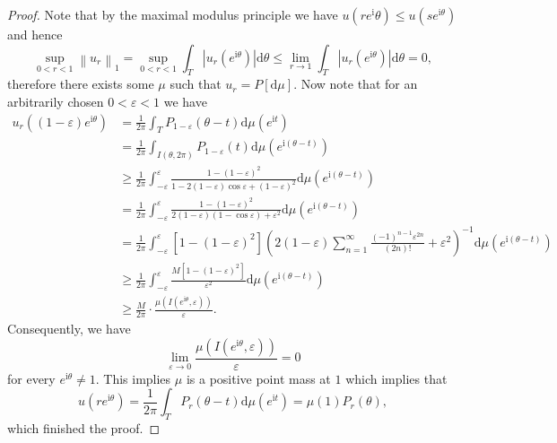 \begin{proof}
Note that by the maximal modulus principle we have $u(re^\mathrm{i}\theta)\le u(se^{\mathrm{i}\theta})$ and hence 
$$
\mathop {\mathrm{sup}} \limits_{0<r<1}\left\| u_r \right\| _1=\mathop {\mathrm{sup}} \limits_{0<r<1}\int_T{\left| u_r\left( e^{\mathrm{i}\theta} \right) \right|\mathrm{d}\theta}\le \lim_{r\rightarrow 1} \int_T{\left| u_r\left( e^{\mathrm{i}\theta} \right) \right|\mathrm{d}\theta}=0,
$$
therefore there exists some $\mu$ such that $u_r=P[\mathrm{d}\mu]$. Now note that for an arbitrarily chosen $0<\varepsilon<1$ we have 
$$
\begin{aligned}
u_r\left( \left( 1-\varepsilon \right) e^{\mathrm{i}\theta} \right) &=\frac{1}{2\pi}\int_T{P_{1-\varepsilon}\left( \theta -t \right) \mathrm{d}\mu \left( e^{\mathrm{i}t} \right)}
\\
&=\frac{1}{2\pi}\int_{I\left( \theta ,2\pi \right)}{P_{1-\varepsilon}\left( t \right) \mathrm{d}\mu \left( e^{\mathrm{i}\left( \theta -t \right)} \right)}
\\
&\ge \frac{1}{2\pi}\int_{-\varepsilon}^{\varepsilon}{\frac{1-\left( 1-\varepsilon \right) ^2}{1-2\left( 1-\varepsilon \right) \cos \varepsilon +\left( 1-\varepsilon \right) ^2}\mathrm{d}\mu \left( e^{\mathrm{i}\left( \theta -t \right)} \right)}
\\
&=\frac{1}{2\pi}\int_{-\varepsilon}^{\varepsilon}{\frac{1-\left( 1-\varepsilon \right) ^2}{2\left( 1-\varepsilon \right) \left( 1-\cos \varepsilon \right) +\varepsilon ^2}\mathrm{d}\mu \left( e^{\mathrm{i}\left( \theta -t \right)} \right)}
\\
&=\frac{1}{2\pi}\int_{-\varepsilon}^{\varepsilon}{\left[ 1-\left( 1-\varepsilon \right) ^2 \right] \left( 2\left( 1-\varepsilon \right) \sum_{n=1}^{\infty}{\frac{\left( -1 \right) ^{n-1}\varepsilon ^{2n}}{\left( 2n \right) !}}+\varepsilon ^2 \right) ^{-1}\mathrm{d}\mu \left( e^{\mathrm{i}\left( \theta -t \right)} \right)}
\\
&\ge \frac{1}{2\pi}\int_{-\varepsilon}^{\varepsilon}{\frac{M\left[ 1-\left( 1-\varepsilon \right) ^2 \right]}{\varepsilon ^2}\mathrm{d}\mu \left( e^{\mathrm{i}\left( \theta -t \right)} \right)}
\\
&\ge \frac{M}{2\pi}\cdot \frac{\mu \left( I\left( e^{\mathrm{i}\theta},\varepsilon \right) \right)}{\varepsilon}.
\end{aligned}
$$
Consequently, we have 
$$
\lim_{\varepsilon \rightarrow 0} \frac{\mu \left( I\left( e^{\mathrm{i}\theta},\varepsilon \right) \right)}{\varepsilon}=0
$$
for every $e^{\mathrm{i}\theta}\ne 1$. This implies $\mu$ is a positive point mass at $1$ which implies that 
$$
u\left( re^{\mathrm{i}\theta} \right) =\frac{1}{2\pi}\int_T{P_r\left( \theta -t \right) \mathrm{d}\mu \left( e^{\mathrm{i}t} \right)}=\mu \left( 1 \right) P_r\left( \theta \right) ,
$$
which finished the proof.
\end{proof}
